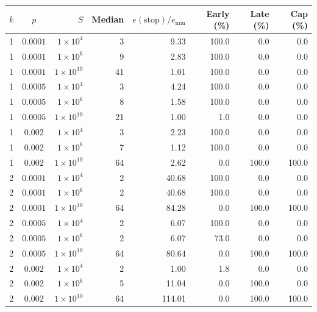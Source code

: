 \begin{tabular}{ccrrrrrr}
\toprule
$k$ & $p$ & $S$ & Median & $e(\mathrm{stop})/e_{\min}$ & Early (\%) & Late (\%) & Cap (\%)\\
\midrule
1 & $0.0001$ & $1\times 10^{4}$ & 3 & 9.33 & 100.0 & 0.0 & 0.0 \\ 
1 & $0.0001$ & $1\times 10^{6}$ & 9 & 2.83 & 100.0 & 0.0 & 0.0 \\ 
1 & $0.0001$ & $1\times 10^{10}$ & 41 & 1.01 & 100.0 & 0.0 & 0.0 \\ 
1 & $0.0005$ & $1\times 10^{4}$ & 3 & 4.24 & 100.0 & 0.0 & 0.0 \\ 
1 & $0.0005$ & $1\times 10^{6}$ & 8 & 1.58 & 100.0 & 0.0 & 0.0 \\ 
1 & $0.0005$ & $1\times 10^{10}$ & 21 & 1.00 & 1.0 & 0.0 & 0.0 \\ 
1 & $0.002$ & $1\times 10^{4}$ & 3 & 2.23 & 100.0 & 0.0 & 0.0 \\ 
1 & $0.002$ & $1\times 10^{6}$ & 7 & 1.12 & 100.0 & 0.0 & 0.0 \\ 
1 & $0.002$ & $1\times 10^{10}$ & 64 & 2.62 & 0.0 & 100.0 & 100.0 \\ 
2 & $0.0001$ & $1\times 10^{4}$ & 2 & 40.68 & 100.0 & 0.0 & 0.0 \\ 
2 & $0.0001$ & $1\times 10^{6}$ & 2 & 40.68 & 100.0 & 0.0 & 0.0 \\ 
2 & $0.0001$ & $1\times 10^{10}$ & 64 & 84.28 & 0.0 & 100.0 & 100.0 \\ 
2 & $0.0005$ & $1\times 10^{4}$ & 2 & 6.07 & 100.0 & 0.0 & 0.0 \\ 
2 & $0.0005$ & $1\times 10^{6}$ & 2 & 6.07 & 73.0 & 0.0 & 0.0 \\ 
2 & $0.0005$ & $1\times 10^{10}$ & 64 & 80.64 & 0.0 & 100.0 & 100.0 \\ 
2 & $0.002$ & $1\times 10^{4}$ & 2 & 1.00 & 1.8 & 0.0 & 0.0 \\ 
2 & $0.002$ & $1\times 10^{6}$ & 5 & 11.04 & 0.0 & 100.0 & 0.0 \\ 
2 & $0.002$ & $1\times 10^{10}$ & 64 & 114.01 & 0.0 & 100.0 & 100.0 \\ 
\bottomrule
\end{tabular}
